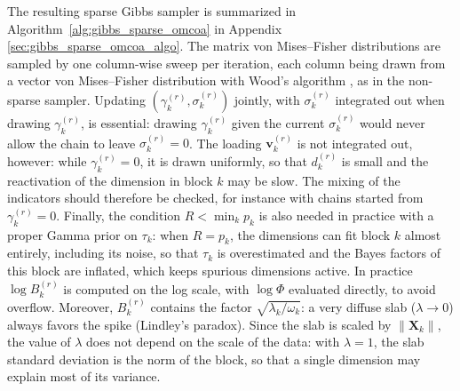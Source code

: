 \documentclass[11pt]{article}
\newcommand{\X}{\mathbf{X}}
\newcommand{\vv}{\mathbf{v}}
\begin{document}
\noindent The resulting sparse Gibbs sampler is summarized in Algorithm~\ref{alg:gibbs_sparse_omcoa} in Appendix \ref{sec:gibbs_sparse_omcoa_algo}. The matrix von Mises--Fisher distributions are sampled by one column-wise sweep per iteration, each column being drawn from a vector von Mises--Fisher distribution with Wood's algorithm \citep{wood1994}, as in the non-sparse sampler. Updating $(\gamma_k^{(r)},\sigma_k^{(r)})$ jointly, with $\sigma_k^{(r)}$ integrated out when drawing $\gamma_k^{(r)}$, is essential:
drawing $\gamma_k^{(r)}$ given the current $\sigma_k^{(r)}$ would never allow the chain to leave $\sigma_k^{(r)}=0$. The loading $\vv_k^{(r)}$ is not integrated out, however: while $\gamma_k^{(r)}=0$, it is drawn uniformly, so that $d_k^{(r)}$ is small and the reactivation of the dimension in block $k$ may be slow. The mixing of the indicators should therefore be checked, for instance with chains started from $\gamma_k^{(r)}=0$. Finally, the condition $R<\min_kp_k$ is also needed in practice with a proper Gamma prior on $\tau_k$: when $R=p_k$, the dimensions can fit block $k$ almost entirely, including its noise, so that $\tau_k$ is overestimated and the Bayes factors of this block are inflated, which keeps spurious dimensions active.
In practice $\log B_k^{(r)}$ is computed on the log scale, with $\log\Phi$ evaluated directly, to avoid overflow. Moreover, $B_k^{(r)}$ contains the factor $\sqrt{\lambda_k/\omega_k}$: a very diffuse slab ($\lambda\to0$) always favors the spike (Lindley's paradox). Since the slab is scaled by $\|\X_k\|$, the value of $\lambda$ does not depend on the scale of the data: with $\lambda=1$, the slab standard deviation is the norm of the block, so that a single dimension may explain most of its variance.
\end{document}
